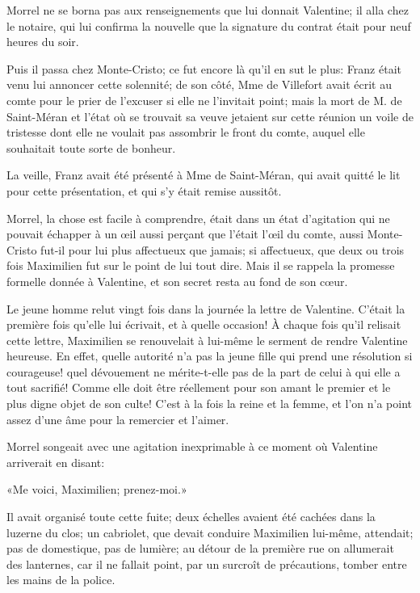 Morrel ne se borna pas aux renseignements que lui donnait Valentine; il alla chez le notaire, qui lui confirma la nouvelle que la signature du contrat était pour neuf heures du soir. 

Puis il passa chez Monte-Cristo; ce fut encore là qu'il en sut le plus: Franz était venu lui annoncer cette solennité; de son côté, Mme de Villefort avait écrit au comte pour le prier de l'excuser si elle ne l'invitait point; mais la mort de M. de Saint-Méran et l'état où se trouvait sa veuve jetaient sur cette réunion un voile de tristesse dont elle ne voulait pas assombrir le front du comte, auquel elle souhaitait toute sorte de bonheur. 

La veille, Franz avait été présenté à Mme de Saint-Méran, qui avait quitté le lit pour cette présentation, et qui s'y était remise aussitôt. 

Morrel, la chose est facile à comprendre, était dans un état d'agitation qui ne pouvait échapper à un œil aussi perçant que l'était l'œil du comte, aussi Monte-Cristo fut-il pour lui plus affectueux que jamais; si affectueux, que deux ou trois fois Maximilien fut sur le point de lui tout dire. Mais il se rappela la promesse formelle donnée à Valentine, et son secret resta au fond de son cœur. 

Le jeune homme relut vingt fois dans la journée la lettre de Valentine. C'était la première fois qu'elle lui écrivait, et à quelle occasion! À chaque fois qu'il relisait cette lettre, Maximilien se renouvelait à lui-même le serment de rendre Valentine heureuse. En effet, quelle autorité n'a pas la jeune fille qui prend une résolution si courageuse! quel dévouement ne mérite-t-elle pas de la part de celui à qui elle a tout sacrifié! Comme elle doit être réellement pour son amant le premier et le plus digne objet de son culte! C'est à la fois la reine et la femme, et l'on n'a point assez d'une âme pour la remercier et l'aimer. 

Morrel songeait avec une agitation inexprimable à ce moment où Valentine arriverait en disant: 

«Me voici, Maximilien; prenez-moi.» 

Il avait organisé toute cette fuite; deux échelles avaient été cachées dans la luzerne du clos; un cabriolet, que devait conduire Maximilien lui-même, attendait; pas de domestique, pas de lumière; au détour de la première rue on allumerait des lanternes, car il ne fallait point, par un surcroît de précautions, tomber entre les mains de la police. 

